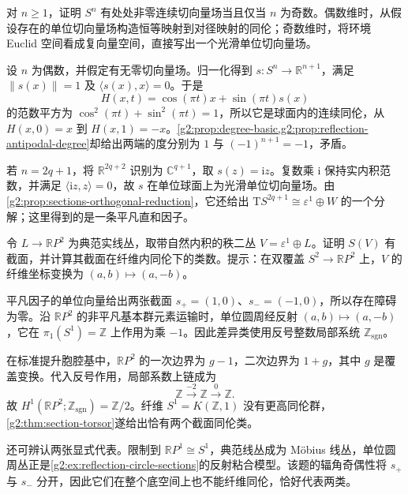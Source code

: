 \begin{exercise}\label{g2:ex:sphere-one-vector-field-parity}
	对 \(n\ge1\)，证明 \(S^n\) 有处处非零连续切向量场当且仅当 \(n\) 为奇数。偶数维时，从假设存在的单位切向量场构造恒等映射到对径映射的同伦；奇数维时，将环境 Euclid 空间看成复向量空间，直接写出一个光滑单位切向量场。
\end{exercise}
\begin{solution}
	设 \(n\) 为偶数，并假定有无零切向量场。归一化得到 \(s:S^n\rightarrow\mathbb R^{n+1}\)，满足 \(\|s(x)\|=1\) 及 \(\langle s(x),x\rangle=0\)。于是
	\[
		H(x,t)=\cos(\pi t)x+\sin(\pi t)s(x)
	\]
	的范数平方为 \(\cos^2(\pi t)+\sin^2(\pi t)=1\)，所以它是球面内的连续同伦，从 \(H(x,0)=x\) 到 \(H(x,1)=-x\)。\cref{g2:prop:degree-basic,g2:prop:reflection-antipodal-degree}却给出两端的度分别为 \(1\) 与 \((-1)^{n+1}=-1\)，矛盾。

	若 \(n=2q+1\)，将 \(\mathbb R^{2q+2}\) 识别为 \(\mathbb C^{q+1}\)，取 \(s(z)=\mathrm iz\)。复数乘 \(\mathrm i\) 保持实内积范数，并满足 \(\langle\mathrm iz,z\rangle=0\)，故 \(s\) 在单位球面上为光滑单位切向量场。由\cref{g2:prop:sections-orthogonal-reduction}，它还给出 \(\mathrm TS^{2q+1}\cong\varepsilon^1\oplus W\) 的一个分解；这里得到的是一条平凡直和因子。
\end{solution}

\begin{exercise}\label{g2:ex:tautological-plane-circle-sections}
	令 \(L\to\mathbb RP^2\) 为典范实线丛，取带自然内积的秩二丛 \(V=\varepsilon^1\oplus L\)。证明 \(S(V)\) 有截面，并计算其截面在纤维内同伦下的类数。提示：在双覆盖 \(S^2\to\mathbb RP^2\) 上，\(V\) 的纤维坐标变换为 \((a,b)\mapsto(a,-b)\)。
\end{exercise}
\begin{solution}
	平凡因子的单位向量给出两张截面 \(s_+=(1,0)\)、\(s_-=(-1,0)\)，所以存在障碍为零。沿 \(\mathbb RP^2\) 的非平凡基本群元素运输时，单位圆周经反射 \((a,b)\mapsto(a,-b)\)，它在 \(\pi_1(S^1)=\mathbb Z\) 上作用为乘 \(-1\)。因此差异类使用反号整数局部系统 \(\mathbb Z_{\mathrm{sgn}}\)。

	在标准提升胞腔基中，\(\mathbb RP^2\) 的一次边界为 \(g-1\)，二次边界为 \(1+g\)，其中 \(g\) 是覆盖变换。代入反号作用，局部系数上链成为
	\[
		\mathbb Z\xrightarrow{-2}\mathbb Z\xrightarrow{0}\mathbb Z.
	\]
	故 \(H^1(\mathbb RP^2;\mathbb Z_{\mathrm{sgn}})=\mathbb Z/2\)。纤维 \(S^1=K(\mathbb Z,1)\) 没有更高同伦群，\cref{g2:thm:section-torsor}遂给出恰有两个截面同伦类。

	还可辨认两张显式代表。限制到 \(\mathbb RP^1\cong S^1\)，典范线丛成为 Möbius 线丛，单位圆周丛正是\cref{g2:ex:reflection-circle-sections}的反射粘合模型。该题的辐角奇偶性将 \(s_+\) 与 \(s_-\) 分开，因此它们在整个底空间上也不能纤维同伦，恰好代表两类。
\end{solution}

